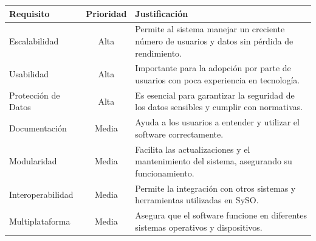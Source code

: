 \begin{tabularx}{\textwidth}{|l|c|X|}
\hline
\textbf{Requisito} & \textbf{Prioridad} & \textbf{Justificación} \\
\hline
Escalabilidad & Alta & Permite al sistema manejar un creciente número de usuarios y datos sin pérdida de rendimiento. \\
\hline
Usabilidad & Alta & Importante para la adopción por parte de usuarios con poca experiencia en tecnología. \\
\hline
Protección de Datos & Alta & Es esencial para garantizar la seguridad de los datos sensibles y cumplir con normativas. \\
\hline
Documentación & Media & Ayuda a los usuarios a entender y utilizar el software correctamente. \\
\hline
Modularidad & Media & Facilita las actualizaciones y el mantenimiento del sistema, asegurando su funcionamiento. \\
\hline
Interoperabilidad & Media & Permite la integración con otros sistemas y herramientas utilizadas en SySO. \\
\hline
Multiplataforma & Media & Asegura que el software funcione en diferentes sistemas operativos y dispositivos. \\
\hline
\end{tabularx}

